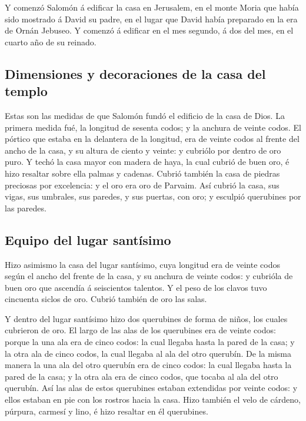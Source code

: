  Y comenzó Salomón á edificar la casa en Jerusalem, en el
monte Moria que había sido mostrado á David su padre, en el lugar que
David había preparado en la era de Ornán Jebuseo.  Y comenzó
á edificar en el mes segundo, á dos del mes, en el cuarto año de su
reinado.

\hypertarget{dimensiones-y-decoraciones-de-la-casa-del-templo}{%
\subsection{Dimensiones y decoraciones de la casa del
templo}\label{dimensiones-y-decoraciones-de-la-casa-del-templo}}

 Estas son las medidas de que Salomón fundó el edificio de
la casa de Dios. La primera medida fué, la longitud de sesenta codos; y
la anchura de veinte codos.  El pórtico que estaba en la
delantera de la longitud, era de veinte codos al frente del ancho de la
casa, y su altura de ciento y veinte: y cubriólo por dentro de oro puro.
 Y techó la casa mayor con madera de haya, la cual cubrió de
buen oro, é hizo resaltar sobre ella palmas y cadenas. 
Cubrió también la casa de piedras preciosas por excelencia: y el oro era
oro de Parvaim.  Así cubrió la casa, sus vigas, sus
umbrales, sus paredes, y sus puertas, con oro; y esculpió querubines por
las paredes.

\hypertarget{equipo-del-lugar-santuxedsimo}{%
\subsection{Equipo del lugar
santísimo}\label{equipo-del-lugar-santuxedsimo}}

 Hizo asimismo la casa del lugar santísimo, cuya longitud
era de veinte codos según el ancho del frente de la casa, y su anchura
de veinte codos: y cubrióla de buen oro que ascendía á seiscientos
talentos.  Y el peso de los clavos tuvo cincuenta siclos de
oro. Cubrió también de oro las salas.

 Y dentro del lugar santísimo hizo dos querubines de forma
de niños, los cuales cubrieron de oro.  El largo de las
alas de los querubines era de veinte codos: porque la una ala era de
cinco codos: la cual llegaba hasta la pared de la casa; y la otra ala de
cinco codos, la cual llegaba al ala del otro querubín.  De
la misma manera la una ala del otro querubín era de cinco codos: la cual
llegaba hasta la pared de la casa; y la otra ala era de cinco codos, que
tocaba al ala del otro querubín.  Así las alas de estos
querubines estaban extendidas por veinte codos: y ellos estaban en pie
con los rostros hacia la casa.  Hizo también el velo de
cárdeno, púrpura, carmesí y lino, é hizo resaltar en él querubines.

